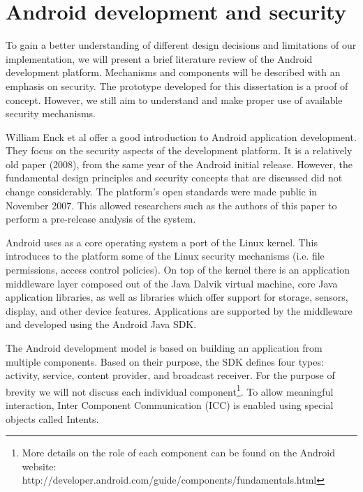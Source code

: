 
\chapter{Android development and security} %

\label{AppendixA} %


To gain a better understanding of different design decisions and limitations of our implementation, we will present a brief literature review of the Android development platform. Mechanisms and components will be described with an emphasis on security. The prototype developed for this dissertation is a proof of concept. However, we still aim to understand and make proper use of available security mechanisms. 

William Enck et al \cite{enck2009understanding} offer a good introduction to Android application development. They focus on the security aspects of the development platform. It is a relatively old paper (2008), from the same year of the Android initial release. However, the fundamental design principles and security concepts that are discussed did not change considerably. The platform's open standards were made public in November 2007. This allowed researchers such as the authors of this paper to perform a pre-release analysis of the system.

Android uses as a core operating system a port of the Linux kernel. This introduces to the platform some of the Linux security mechanisms (i.e. file permissions, access control policies). On top of the kernel there is an application middleware layer composed out of the Java Dalvik virtual machine, core Java application libraries, as well as libraries which offer support for storage, sensors, display, and other device features. Applications are supported by the middleware and developed using the Android Java SDK.

The Android development model is based on building an application from multiple components. Based on their purpose, the SDK defines four types: activity, service, content provider, and broadcast receiver. For the purpose of brevity we will not discuss each individual component\footnote{More details on the role of each component can be found on the Android website: http://developer.android.com/guide/components/fundamentals.html}. To allow meaningful interaction, Inter Component Communication (ICC) is enabled using special objects called Intents.

